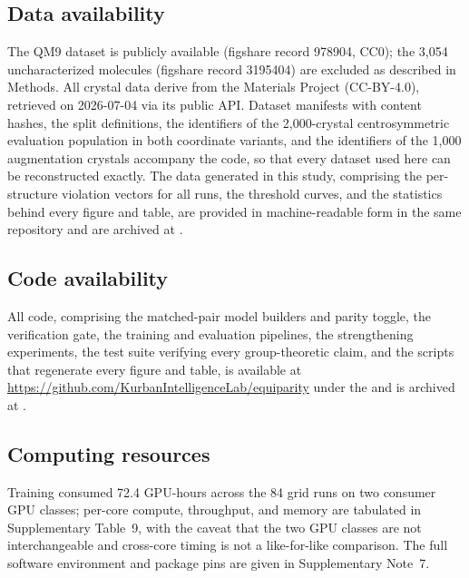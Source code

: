 \subsection*{Data availability}

The QM9 dataset is publicly available (figshare record 978904, CC0); the 3,054 uncharacterized molecules (figshare record 3195404) are excluded as described in Methods. All crystal data derive from the Materials Project (CC-BY-4.0), retrieved on 2026-07-04 via its public API. Dataset manifests with content hashes, the split definitions, the identifiers of the 2,000-crystal centrosymmetric evaluation population in both coordinate variants, and the identifiers of the 1,000 augmentation crystals accompany the code, so that every dataset used here can be reconstructed exactly. The data generated in this study, comprising the per-structure violation vectors for all runs, the threshold curves, and the statistics behind every figure and table, are provided in machine-readable form in the same repository and are archived at .

\subsection*{Code availability}

All code, comprising the matched-pair model builders and parity toggle, the verification gate, the training and evaluation pipelines, the strengthening experiments, the test suite verifying every group-theoretic claim, and the scripts that regenerate every figure and table, is available at \url{https://github.com/KurbanIntelligenceLab/equiparity} under the  and is archived at .

\subsection*{Computing resources}

Training consumed 72.4 GPU-hours across the 84 grid runs on two consumer GPU classes; per-core compute, throughput, and memory are tabulated in Supplementary Table~9, with the caveat that the two GPU classes are not interchangeable and cross-core timing is not a like-for-like comparison. The full software environment and package pins are given in Supplementary Note~7.


